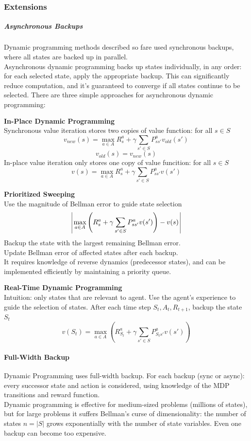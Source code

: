 \documentclass[10pt]{report}
\begin{document}
\subsubsection{Extensions}
\subparagraph{Asynchronous Backups} Dynamic programming methods described so fare used synchronous backups, where all states are backed up in parallel.\\
Asynchronous dynamic programming backs up states individually, in any order: for each selected state, apply the appropriate backup. This can significantly reduce computation, and it's guaranteed to converge if all states continue to be selected. There are three simple approaches for asynchronous dynamic programming:
\begin{list}{}{}
	\item \textbf{In-Place Dynamic Programming}\\
	Synchronous value iteration stores two copies of value function: for all $s\in S$ $$v_{new}(s) = \max_{a\in A}R_s^a+\gamma\sum_{s'\in S}P_{ss'}^av_{old}(s')$$
	$$v_{old}(s) = v_{new}(s)$$
	In-place value iteration only stores one copy of value funcition: for all $s\in S$ $$v(s) = \max_{a\in A}R_s^a+\gamma\sum_{s'\in S}P_{ss'}^av(s')$$
	\item \textbf{Prioritized Sweeping}\\
	Use the magnitude of Bellman error to guide state selection
	$$\vline\:\max_{a\in A}\left(R_s^a+\gamma\sum_{s'\in S}P_{ss'}^av(s')\right)-v(s)\:\vline$$
	Backup the state with the largest remaining Bellman error.\\
	Update Bellman error of affected states after each backup.\\
	It requires knowledge of reverse dynamics (predecessor states), and can be implemented efficiently by maintaining a priority queue.
	\item \textbf{Real-Time Dynamic Programming}\\
	Intuition: only states that are relevant to agent. Use the agent's experience to guide the selection of states. After each time step $S_t,A_t,R_{t+1}$, backup the state $S_t$
	$$v(S_t) = \max_{a\in A}\left(R_{S_t}^a+\gamma\sum_{s'\in S}P_{S_ts'}^av(s')\right)$$
\end{list}
\paragraph{Full-Width Backup} Dynamic Programming uses full-width backup. For each backup (sync or async): every successor state and action is considered, using knowledge of the MDP transitions and reward function.\\
Dynamic programming is effective for medium-sized problems (millions of states), but for large problems it suffers Bellman's curse of dimensionality: the number of states $n = |S|$ grows exponentially with the number of state variables. Even one backup can become too expensive.
\end{document}
